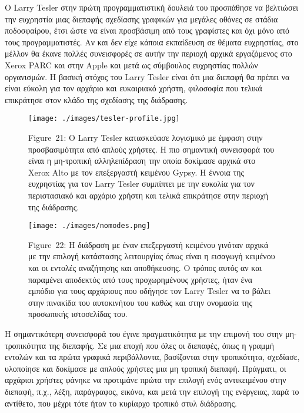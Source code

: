 \documentclass[
]{article}
\begin{document}
Ο Larry Tesler στην πρώτη προγραμματιστική δουλειά του προσπάθησε να
βελτιώσει την ευχρηστία μιας διεπαφής σχεδίασης γραφικών για μεγάλες
οθόνες σε στάδια ποδοσφαίρου, έτσι ώστε να είναι προσβάσιμη από τους
γραφίστες και όχι μόνο από τους προγραμματιστές. Αν και δεν είχε κάποια
εκπαίδευση σε θέματα ευχρηστίας, στο μέλλον θα έκανε πολλές συνεισφορές
σε αυτήν την περιοχή αρχικά εργαζόμενος στο Xerox PARC και στην Apple
και μετά ως σύμβουλος ευχρηστίας πολλών οργανισμών. Η βασική στόχος του
Larry Tesler είναι ότι μια διεπαφή θα πρέπει να είναι εύκολη για τον
αρχάριο και ευκαιριακό χρήστη, φιλοσοφία που τελικά επικράτησε στον
κλάδο της σχεδίασης της διάδρασης.

\leavevmode{}%
\begin{figure}
\hypertarget{fig:tesler-profile}{%
\centering
\texttt{[image: ./images/tesler-profile.jpg]}
\caption{Figure~21: Ο Larry Tesler κατασκεύασε λογισμικό με έμφαση στην
προσβασιμότητα από απλούς χρήστες. Η πιο σημαντική συνεισφορά του είναι
η μη-τροπική αλληλεπίδραση την οποία δοκίμασε αρχικά στο Xerox Alto με
τον επεξεργαστή κειμένου Gypsy. Η έννοια της ευχρηστίας για τον Larry
Tesler συμπίπτει με την ευκολία για τον περιστασιακό και αρχάριο χρήστη
και τελικά επικράτησε στην περιοχή της
διάδρασης.}\label{fig:tesler-profile}
}
\end{figure}

\leavevmode{}%
\begin{figure}
\hypertarget{fig:nomodes}{%
\centering
\texttt{[image: ./images/nomodes.png]}
\caption{Figure~22: Η διάδραση με έναν επεξεργαστή κειμένου γινόταν
αρχικά με την επιλογή κατάστασης λειτουργίας όπως είναι η εισαγωγή
κειμένου και οι εντολές αναζήτησης και αποθήκευσης. Ο τρόπος αυτός αν
και παραμένει αποδεκτός από τους προχωρημένους χρήστες, ήταν ένα εμπόδιο
για τους αρχάριους που οδήγησε τον Larry Tesler να το βάλει στην
πινακίδα του αυτοκινήτου του καθώς και στην ονομασία της προσωπικής
ιστοσελίδας του.}\label{fig:nomodes}
}
\end{figure}

Η σημαντικότερη συνεισφορά του έγινε πραγματικότητα με την επιμονή του
στην μη-τροπικότητα της διεπαφής. Σε μια εποχή που όλες οι διεπαφές,
όπως η γραμμή εντολών και τα πρώτα γραφικά περιβάλλοντα, βασίζονται στην
τροπικότητα, σχεδίασε, υλοποίησε και δοκίμασε με απλούς χρήστες μια μη
τροπική διεπαφή. Πράγματι, οι αρχάριοι χρήστες φάνηκε να προτιμάνε πρώτα
την επιλογή ενός αντικειμένου στην διεπαφή, π.χ., λέξη, παράγραφος,
εικόνα, και μετά την επιλογή της ενέργειας, παρά το αντίθετο, που μέχρι
τότε ήταν το κυρίαρχο τροπικό στυλ διάδρασης.
\end{document}
